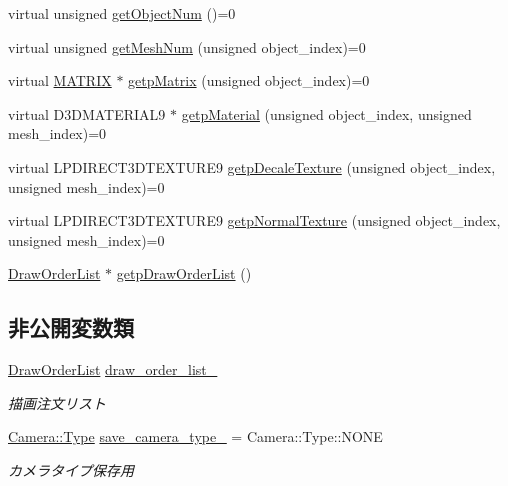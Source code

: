 \begin{DoxyCompactItemize}
virtual unsigned \mbox{\hyperlink{class_draw_base_a57c010b4386dc09afa124fba81a6e0fc}{get\+Object\+Num}} ()=0
\item 
virtual unsigned \mbox{\hyperlink{class_draw_base_add488139aed539e7ccd19492702b4bee}{get\+Mesh\+Num}} (unsigned object\+\_\+index)=0
\item 
virtual \mbox{\hyperlink{_vector3_d_8h_a032295cd9fb1b711757c90667278e744}{M\+A\+T\+R\+IX}} $\ast$ \mbox{\hyperlink{class_draw_base_a60fc3148b2679e4ea7723d2af0c37283}{getp\+Matrix}} (unsigned object\+\_\+index)=0
\item 
virtual D3\+D\+M\+A\+T\+E\+R\+I\+A\+L9 $\ast$ \mbox{\hyperlink{class_draw_base_a940543b482e934624637f3c6b4d17f96}{getp\+Material}} (unsigned object\+\_\+index, unsigned mesh\+\_\+index)=0
\item 
virtual L\+P\+D\+I\+R\+E\+C\+T3\+D\+T\+E\+X\+T\+U\+R\+E9 \mbox{\hyperlink{class_draw_base_a9f50a030778dbfca5ae45bb7908e0d58}{getp\+Decale\+Texture}} (unsigned object\+\_\+index, unsigned mesh\+\_\+index)=0
\item 
virtual L\+P\+D\+I\+R\+E\+C\+T3\+D\+T\+E\+X\+T\+U\+R\+E9 \mbox{\hyperlink{class_draw_base_a76c3b910b495fcf69aacf6164ca90c7d}{getp\+Normal\+Texture}} (unsigned object\+\_\+index, unsigned mesh\+\_\+index)=0
\item 
\mbox{\hyperlink{class_draw_order_list}{Draw\+Order\+List}} $\ast$ \mbox{\hyperlink{class_draw_base_a280d750f48f6b8d148cbfe2988834268}{getp\+Draw\+Order\+List}} ()
\end{DoxyCompactItemize}
\subsection*{非公開変数類}
\begin{DoxyCompactItemize}
\item 
\mbox{\hyperlink{class_draw_order_list}{Draw\+Order\+List}} \mbox{\hyperlink{class_draw_base_a6ebc8dc96176ddd3bd984b3d54739adb}{draw\+\_\+order\+\_\+list\+\_\+}}
\begin{DoxyCompactList}\small\item\em 描画注文リスト \end{DoxyCompactList}\item 
\mbox{\hyperlink{class_camera_a3b0a1f58deca679ac665f61c480d1dcb}{Camera\+::\+Type}} \mbox{\hyperlink{class_draw_base_aa8be4980756a0af7cc76dfe455c492d4}{save\+\_\+camera\+\_\+type\+\_\+}} = Camera\+::\+Type\+::\+N\+O\+NE
\begin{DoxyCompactList}\small\item\em カメラタイプ保存用 \end{DoxyCompactList}\end{DoxyCompactItemize}


